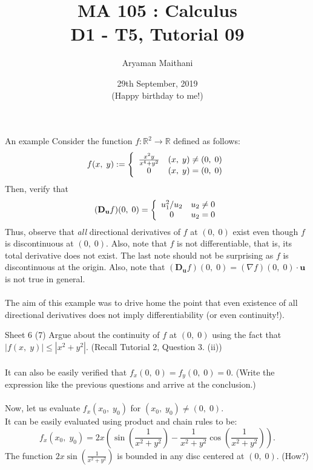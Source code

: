 \documentclass[handout, aspectratio=169]{beamer}
\title{MA 105 : Calculus\\ D1 - T5, Tutorial 09}  %
\author{Aryaman Maithani}
\date[29-09-2019]{29th September, 2019\\ \tiny (Happy birthday to me!)}               %
\institute[IITB]{IIT Bombay}
\begin{document}
\begin{frame}
	\titlepage
\end{frame}
\begin{frame}{An example}
	Consider the function $f:\mathbb{R}^2 \to \mathbb{R}$ defined as follows:
	\[f(x,\;y) := \left\{
	\begin{array}{c c}
		\frac{x^2y}{x^4 + y^2} & (x,\; y) \neq (0,\;0)\\
		0 & (x,\;y) = (0,\;0)
	\end{array}
	\right.\]
	Then, verify that
	\[(\mathbf{D_{u}}f)(0,\;0) = \left\{
	\begin{array}{c c}
		u_1^2/u_2 & u_2 \neq 0\\
		0 & u_2 = 0
	\end{array}
	\right.\]
	Thus, observe that \emph{all} directional derivatives of $f$ at $(0,\;0)$ exist even though $f$ is discontinuous at $(0,\;0).$ Also, note that $f$ is not differentiable, that is, its total derivative does not exist. The last note should not be surprising as $f$ is discontinuous at the origin. Also, note that $(\mathbf{D_u}f)(0,\;0) = (\nabla f)(0,\;0)\cdot\mathbf{u}$ is not true in general.\\~\\
	The aim of this example was to drive home the point that even existence of all directional derivatives does not imply differentiability (or even continuity!).
\end{frame}
\begin{frame}{Sheet 6}
	(7) Argue about the continuity of $f$ at $(0,\;0)$ using the fact that $|f(x,\;y)| \le |x^2 + y^2|.$ (Recall Tutorial 2, Question 3. (ii))\\~\\
	It can also be easily verified that $f_x(0,\;0) = f_y(0,\;0) = 0.$ (Write the expression like the previous questions and arrive at the conclusion.)\\~\\
	Now, let us evaluate $f_x(x_0,\;y_0)$ for $(x_0,\;y_0) \neq (0,\;0).$\\
	It can be easily evaluated using product and chain rules to be:
	\[f_x(x_0,\;y_0) = 2x\left(\sin\left(\frac{1}{x^2 + y^2}\right) - \frac{1}{x^2 + y^2}\cos\left(\frac{1}{x^2 + y^2}\right)\right).\]
	The function $\displaystyle2x\sin\left(\frac{1}{x^2 + y^2}\right)$ is bounded in any disc centered at $(0,\;0).$ \hfill (How?)\\
\end{frame}
	
\end{document}
